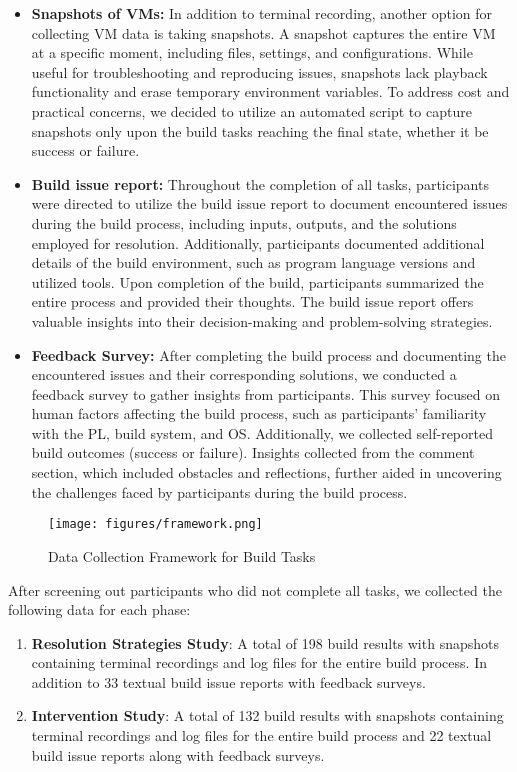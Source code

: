 \documentclass[10pt, conference]{IEEEtran}
\begin{document}
\begin{itemize}[leftmargin=*]
\item \textbf{Snapshots of VMs:}
In addition to terminal recording, another option for collecting VM data is taking snapshots. A snapshot captures the entire VM at a specific moment, including files, settings, and configurations. While useful for troubleshooting and reproducing issues, snapshots lack playback functionality and erase temporary environment variables. To address cost and practical concerns, we decided to utilize an automated script to capture snapshots only upon the build tasks reaching the final state, whether it be success or failure.
\item \textbf{Build issue report:}
Throughout the completion of all tasks, participants were directed to utilize the build issue report to document encountered issues during the build process, including inputs, outputs, and the solutions employed for resolution. Additionally, participants documented additional details of the build environment, such as program language versions and utilized tools. Upon completion of the build, participants summarized the entire process and provided their thoughts. The build issue report offers valuable insights into their decision-making and problem-solving strategies.

\item \textbf{Feedback Survey:}
After completing the build process and documenting the encountered issues and their corresponding solutions, we conducted a feedback survey to gather insights from participants. This survey focused on human factors affecting the build process, such as participants' familiarity with the PL, build system, and OS. Additionally, we collected self-reported build outcomes (success or failure). Insights collected from the comment section, which included obstacles and reflections, further aided in uncovering the challenges faced by participants during the build process.
\end{itemize}

\begin{figure}[tbp]
\centerline{
\texttt{[image: figures/framework.png]}
}
\vspace{-.2cm}
\caption{Data Collection Framework for Build Tasks}
\vspace{-.4cm}
\label{fig:framework}
\end{figure}

After screening out participants who did not complete all tasks, we collected the following data for each phase:

\begin{enumerate}[leftmargin=*]
  \item \textbf{Resolution Strategies Study}: A total of 198 build results with snapshots containing terminal recordings and log files for the entire build process. In addition to 33 textual build issue reports with feedback surveys.
  \item \textbf{Intervention Study}: A total of 132 build results with snapshots containing terminal recordings and log files for the entire build process and 22 textual build issue reports along with feedback surveys.
\end{enumerate}
\end{document}
